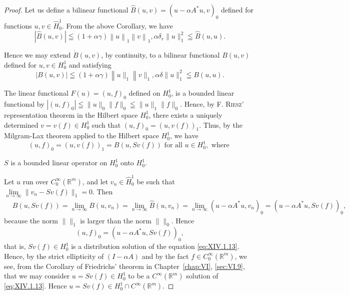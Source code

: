 \begin{proof}
 Let us define a bilinear functional $\hat{B}(u,v) = (u - \alpha A^{*}u,v)_{0}$ defined for functions $u, v \in \hat{H}_{0}^{1}$. From the above Corollary, we have 
\begin{equation}\label{eq:XIV.1.14}
\left| \hat {B} (u, v) \right| \leqq (1 + \alpha \gamma) \left\| u \right\| _{1} \left\| v \right\| _{1}, \alpha \delta_{r} \| u \| _{1} ^{2} \leqq \hat {B} (u, u). \end{equation}

Hence we may extend $\dot{B}(u,v)$, by continuity, to a bilinear functional $B(u,v)$ defined for $u,v\in H_{0}^{1}$ and satisfying 
\begin{equation}\tag{14'}\label{eq:XIV.1.14'}
\left| B (u, v) \right| \leqq (1 + \alpha \gamma) \left\| u \| _{1} \right\| v \| _{1}, \alpha \delta \| u \| _{1} ^{2} \leqq B (u, u).
\end{equation}

The linear functional $F(u) = (u, f)_0$ defined on $H_0^1$, is a bounded linear functional by $|(u, f)_0| \leqq \|u\|_0 \|f\|_0 \leqq \|u\|_1 \|f\|_0$. Hence, by F. \textsc{Riesz}' representation theorem in the Hilbert space $H_0^1$, there exists a uniquely determined $v = v(f) \in H_0^1$ such that $(u, f)_0 = (u, v(f))_1$. Thus, by the Milgram-Lax theorem applied to the Hilbert space $H_0^1$, we have 
\begin{equation}\label{eq:XIV.1.15}
(u, f) _{0} = (u, v (f)) _{1} = B (u, S v (f)) \text{ for all } u \in H _{0} ^{1}, \text{ where }
\end{equation}

$S$ is a bounded linear operator on $H_{0}^{1}$ onto $H_{0}^{1}$. 


Let $u$ run over $C_0^\infty(\mathbb{R}^{m})$, and let $v_n \in \hat{H}_0^1$ be such that $\lim\limits_{n \to \infty} \|v_n - Sv(f)\|_1 = 0$. Then 
\[
\begin{aligned}
&B (u, S v (f))= \lim\limits _{n \rightarrow \infty} B (u, v _{n}) = \lim\limits _{n \rightarrow \infty} \hat {B} (u, v _{n}) = \lim\limits _{n \rightarrow \infty} (u - \alpha A ^{*} u, v _{n}) _{0} = (u - \alpha A ^{*} u, S v (f)) _{0},
\end{aligned}
\]
because the norm $\|\|_1$ is larger than the norm $\|\|_0$. Hence 
\begin{equation}\tag{15'}\label{eq:XIV.1.15'}
(u, f) _{0} = (u - \alpha A ^{*} u, S v (f)) _{0},
\end{equation}
that is, $Sv(f) \in H_0^1$ is a distribution solution of the equation \eqref{eq:XIV.1.13}. Hence, by the strict ellipticity of $(I - \alpha A)$ and by the fact $f \in C_0^\infty(\mathbb{R}^{m})$, we see, from the Corollary of Friedrichs' theorem in Chapter~\ref{chap:VI}, \ref{sec:VI.9}, that we may consider $u = Sv(f) \in H_0^1$ to be a $C^\infty(\mathbb{R}^{m})$ solution of \eqref{eq:XIV.1.13}. Hence $u = Sv(f) \in H_0^1 \cap C^\infty(\mathbb{R}^{m})$. 



\end{proof}
